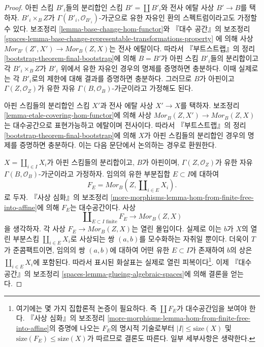 \begin{proof}
아핀 스킴 $B'_i$들의 분리합인 스킴 $B' = \coprod B'_i$와
전사 에탈 사상 $B' \to B$를 택하자.
$B'_i \times_B Z$가 $\Gamma(B'_i, \mathcal{O}_{B'_i})$-가군으로
유한 자유인 환의 스펙트럼이라고도 가정할 수 있다.
보조정리 \ref{lemma-base-change-hom-functor}와 『대수 공간』의 보조정리
\ref{spaces-lemma-base-change-representable-transformations-property}
에 의해 사상
$\mathit{Mor}_{B'}(Z', X') \to \mathit{Mor}_B(Z, X)$는 전사 에탈이다.
따라서 『부트스트랩』의 정리 \ref{bootstrap-theorem-final-bootstrap}에
의해 $B = B'$가 아핀 스킴 $B'_i$들의 분리합이고 각
$B'_i \times_B Z$가 $B'_i$ 위에서 유한 자유인 경우의 명제를
증명하면 충분하다. 이때 실제로는 각 $B'_i$로의 제한에 대해 결과를
증명하면 충분하다. 그러므로 $B$가 아핀이고
$\Gamma(Z, \mathcal{O}_Z)$가 유한 자유
$\Gamma(B, \mathcal{O}_B)$-가군이라고 가정해도 된다.

\medskip\noindent
아핀 스킴들의 분리합인 스킴 $X'$과 전사 에탈 사상
$X' \to X$를 택하자. 보조정리
\ref{lemma-etale-covering-hom-functor}에 의해 사상
$\mathit{Mor}_B(Z, X') \to \mathit{Mor}_B(Z, X)$는 대수공간으로
표현가능하고 에탈이며 전사이다. 따라서 『부트스트랩』의 정리
\ref{bootstrap-theorem-final-bootstrap}에 의해 $X$가 아핀 스킴들의
분리합인 경우의 명제를 증명하면 충분하다. 이는 다음 문단에서
논의하는 경우로 환원한다.

\medskip\noindent
$X = \coprod_{i \in I} X_i$가 아핀 스킴들의 분리합이고, $B$가
아핀이며, $\Gamma(Z, \mathcal{O}_Z)$가 유한 자유
$\Gamma(B, \mathcal{O}_B)$-가군이라고 가정하자.
임의의 유한 부분집합 $E \subset I$에 대하여
$$
F_E = \mathit{Mor}_B(Z, \coprod\nolimits_{i \in E} X_i).
$$
로 두자. 『사상 심화』의 보조정리
\ref{more-morphisms-lemma-hom-from-finite-free-into-affine}에 의해
$F_E$는 대수공간이다. 사상
$$
\coprod\nolimits_{E \subset I\text{ finite}} F_E
\longrightarrow
\mathit{Mor}_B(Z, X)
$$
을 생각하자. 각 사상
$F_E \to \mathit{Mor}_B(Z, X)$는 열린 몰입이다. 실제로 이는
$b$가 $X$의 열린 부분스킴 $\coprod\nolimits_{i \in E} X_i$로
사상되는 쌍 $(a, b)$를 모수화하는 자취일 뿐이다.
더욱이 $T$가 준콤팩트이면, 임의의 쌍 $(a, b)$에 대하여
어떤 유한 $E \subset I$가 존재하여 $b$의 상은
$\coprod\nolimits_{i \in E} X_i$에 포함된다. 따라서 표시된 화살표는
실제로 열린 피복이다\footnote{
여기에는 몇 가지 집합론적 논증이 필요하다. 즉 $\coprod F_E$가
대수공간임을 보여야 한다. 『사상 심화』의 보조정리
\ref{more-morphisms-lemma-hom-from-finite-free-into-affine}의 증명에 나오는
$F_E$의 명시적 기술로부터 $|I| \leq \text{size}(X)$ 및
$\text{size}(F_E) \leq \text{size}(X)$가 따르므로 결론도 따른다.
일부 세부사항은 생략한다.}. 이제 『대수 공간』의 보조정리
\ref{spaces-lemma-glueing-algebraic-spaces}에 의해 결론을 얻는다.
\end{proof}










